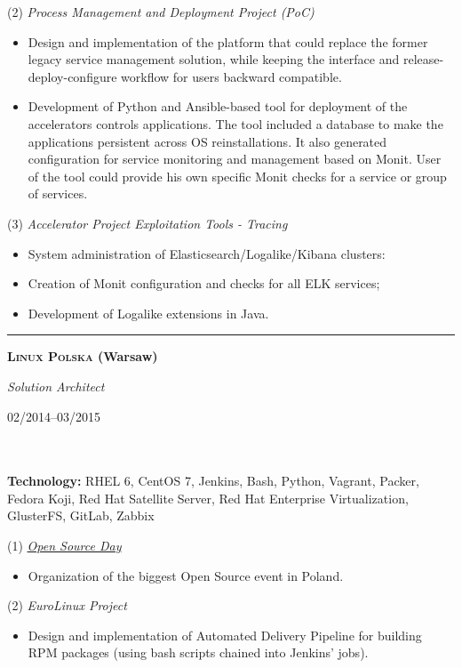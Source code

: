 \documentclass[$fontsize$, a4paper]{article}
\newcommand\textbox[1]{%
  \parbox{.333\textwidth}{#1}%
}
\begin{document}
(2) \emph{Process Management and Deployment Project (PoC)}
\begin{itemize}
  \item Design and implementation of the platform that could replace the former legacy service management solution,
  while keeping the interface and release-deploy-configure workflow for users backward compatible.
  \item Development of Python and Ansible-based tool for deployment of the accelerators controls applications. The tool included a database to make the applications persistent across OS reinstallations. It also generated configuration for service monitoring and management based on Monit. User of the tool could provide his own specific Monit checks for a service or group of services.
\end{itemize}

\vspace{5pt}
(3) \emph{Accelerator Project Exploitation Tools - Tracing}
\begin{itemize}
  \item System administration of Elasticsearch/Logalike/Kibana clusters:
  \item Creation of Monit configuration and checks for all ELK services;
  \item Development of Logalike extensions in Java.
\end{itemize}


\noindent\rule[0.5ex]{\linewidth}{1pt}

\noindent\textbox{\textbf{\textsc{Linux Polska} (Warsaw)}\hfill}\textbox{\hfil \emph{Solution Architect}\hfil}\textbox{\hfill 02/2014--03/2015}\\\\
\textbf{Technology:} RHEL 6, CentOS 7, Jenkins, Bash, Python, Vagrant, Packer, Fedora Koji, Red Hat Satellite Server, Red Hat Enterprise Virtualization, GlusterFS, GitLab, Zabbix

\vspace{5pt}
(1) \emph{\href{http://opensourceday.com/}{Open Source Day}}
\begin{itemize}
  \item Organization of the biggest Open Source event in Poland.
\end{itemize}

(2) \emph{EuroLinux Project}
\begin{itemize}
  \item Design and implementation of Automated Delivery Pipeline for building RPM packages (using bash scripts chained into Jenkins' jobs).
\end{itemize}
\end{document}
